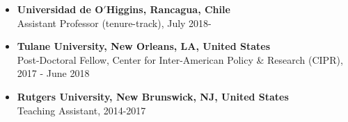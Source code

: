 \begin{itemize}
  \item[] {\bf Universidad de O$'$Higgins, Rancagua, Chile}\\
  Assistant Professor (tenure-track), July 2018-

  \item[] {\bf Tulane University, New Orleans, LA, United States}\\
  Post-Doctoral Fellow, Center for Inter-American Policy \& Research (CIPR), 2017 - June 2018

  \item[] {\bf Rutgers University, New Brunswick, NJ, United States}\\
  Teaching Assistant, 2014-2017
\end{itemize}
